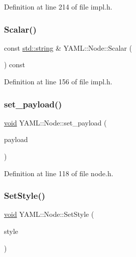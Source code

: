 Definition at line 214 of file impl.\+h.

\mbox{\label{class_y_a_m_l_1_1_node_a774e1077cccab9a72137e0634557a275}} 
\subsubsection{\texorpdfstring{Scalar()}{Scalar()}}
{\footnotesize\ttfamily const \mbox{\hyperlink{glad_8h_ac83513893df92266f79a515488701770}{std\+::string}} \& Y\+A\+M\+L\+::\+Node\+::\+Scalar (\begin{DoxyParamCaption}{ }\end{DoxyParamCaption}) const\hspace{0.3cm}{\ttfamily [inline]}}



Definition at line 156 of file impl.\+h.

\mbox{\label{class_y_a_m_l_1_1_node_a7afde68585bc7a476435fde6086b4d35}} 
\subsubsection{\texorpdfstring{set\_payload()}{set\_payload()}}
{\footnotesize\ttfamily \mbox{\hyperlink{glad_8h_a950fc91edb4504f62f1c577bf4727c29}{void}} Y\+A\+M\+L\+::\+Node\+::set\+\_\+payload (\begin{DoxyParamCaption}\item[{\mbox{\hyperlink{glad_8h_a950fc91edb4504f62f1c577bf4727c29}{void}} $\ast$}]{payload }\end{DoxyParamCaption})\hspace{0.3cm}{\ttfamily [inline]}}



Definition at line 118 of file node.\+h.

\mbox{\label{class_y_a_m_l_1_1_node_a92be22e98028ac4e126ac8f036ed9e45}} 
\subsubsection{\texorpdfstring{SetStyle()}{SetStyle()}}
{\footnotesize\ttfamily \mbox{\hyperlink{glad_8h_a950fc91edb4504f62f1c577bf4727c29}{void}} Y\+A\+M\+L\+::\+Node\+::\+Set\+Style (\begin{DoxyParamCaption}\item[{\mbox{\hyperlink{struct_y_a_m_l_1_1_emitter_style_ae86640662c85ce6062a37f9636b6959f}{Emitter\+Style\+::value}}}]{style }\end{DoxyParamCaption})\hspace{0.3cm}{\ttfamily [inline]}}




